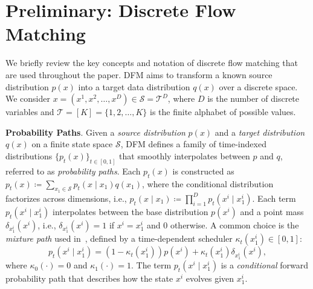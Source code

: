 \section{Preliminary: Discrete Flow Matching}
\label{sec:preliminary}
We briefly review the key concepts and notation of discrete flow matching \citep{gat2024discrete,wang2025fudoki} that are used throughout the paper. 
DFM aims to transform a known source distribution $p(x)$ into a target data distribution $q(x)$ over a discrete space. 
We consider $x=(x^1, x^2, \ldots, x^D) \in \mathcal{S}=\mathcal{T}^D$, where $D$ is the number of discrete variables and $\mathcal{T}=[K]=\{1,2,\ldots,K\}$ is the finite alphabet of possible values.

\textbf{Probability Paths}.
Given a \emph{source distribution} \( p(x) \) and a \emph{target distribution} \( q(x) \) on a finite state space \( \mathcal{S} \), DFM defines a family of time-indexed distributions \( \{p_t(x)\}_{t \in [0,1]} \) that smoothly interpolates between \( p \) and \( q \), referred to as \emph{probability paths}.
Each \( p_t(x) \) is constructed as
$p_t(x) \coloneqq \sum_{x_1 \in \mathcal{S}} p_t(x \mid x_1) q(x_1)$,
where the conditional distribution factorizes across dimensions, i.e., $p_t(x \mid x_1) \coloneqq \prod_{i=1}^D p_t(x^i \mid x_1^i)$.
Each term \( p_t(x^i \mid x_1^i) \) interpolates between the base distribution \( p(x^i) \) and a point mass \( \delta_{x_1^i}(x^i) \), i.e., $\delta_{x_1^i}(x^i)=1$ if $x^i=x_1^i$ and $0$ otherwise. 
A common choice is the \emph{mixture path} used in~\citep{gat2024discrete,havasi2025edit}, defined by a time-dependent scheduler \( \kappa_t(x_1^i) \in [0, 1] \):
\begin{equation}
p_t(x^i \mid x_1^i) = (1 - \kappa_t(x_1^i)) p(x^i) + \kappa_t(x_1^i) \delta_{x_1^i}(x^i),
\label{eq:mask_probability_path}
\end{equation}
where \( \kappa_0(\cdot) = 0 \) and \( \kappa_1(\cdot) = 1 \). The term $p_t(x^i \mid x_1^i)$ is a \emph{conditional} forward probability path that describes how the state $x^i$ evolves given $x_1^i$. 


